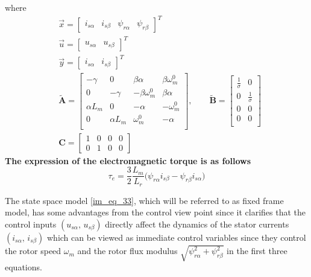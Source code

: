 \documentclass[11pt,a4paper]{scrartcl}
\numberwithin{equation}{section}
\theoremstyle{it}
\theoremstyle{definition}
\begin{document}
\begin{onehalfspace}
\begin{mybox}
\begin{equation}
	\end{equation}
	where
	\begin{equation}\label{im_eq_37}
		\begin{aligned}
			&\vec{x} = \begin{bmatrix} 
				i_{s\alpha}&i_{s\beta}&\psi_{r\alpha}&\psi_{r\beta} 
			\end{bmatrix}^T\\[6pt]
			&\vec{u} = \begin{bmatrix} u_{s\alpha}&u_{s\beta} 
			\end{bmatrix}^T\\[6pt]
			&\vec{y} = \begin{bmatrix} i_{s\alpha}&i_{s\beta} 
			\end{bmatrix}^T\\[6pt]
			&\tilde{\mathbf{A}} = \begin{bmatrix}
				-\gamma&0&\beta\alpha&\beta\omega_m^0 \\[6pt]			
				0&-\gamma&-\beta\omega_m^0&\beta\alpha \\[6pt]
				\alpha L_m&0&-\alpha&-\omega_m^0 \\[6pt]
				0&\alpha L_m&\omega_m^0&-\alpha \\[6pt]
			\end{bmatrix},\qquad
			\tilde{\mathbf{B}} = \begin{bmatrix}
				\frac{1}{\sigma}&0 \\[6pt]			
				0&\frac{1}{\sigma} \\[6pt]
				0&0 \\[6pt]
				0&0 \\[6pt]
			\end{bmatrix} \\[6pt]
			&\mathbf{C} = \begin{bmatrix}
				1&0&0&0 \\[6pt]			
				0&1&0&0	
			\end{bmatrix}
		\end{aligned}
	\end{equation}
	\textbf{The expression of the electromagnetic torque is as follows}
	\begin{equation}\label{im_eq_38}
		\tau_e = \frac{3}{2}\frac{L_m}{L_r}\Big(\psi_{r\alpha}i_{s\beta} - 
		\psi_{r\beta}i_{s\alpha}\Big)
	\end{equation}
\end{mybox}

The state space model \ref{im_eq_33}, which will be referred to as fixed frame 
model, has some advantages from the control view point since it clarifies that 
the control inputs $\left(u_{s\alpha},\, u_{s\beta}\right)$ directly affect the 
dynamics of the stator currents $\left(i_{s\alpha},\, i_{s\beta}\right)$ which 
can be viewed as immediate control variables since they control the rotor speed 
$\omega_m$ and the rotor flux modulus $\sqrt{\psi_{r\alpha}^2 + 
	\psi_{r\beta}^2}$ in the first three equations.


\end{onehalfspace}
\end{document}
